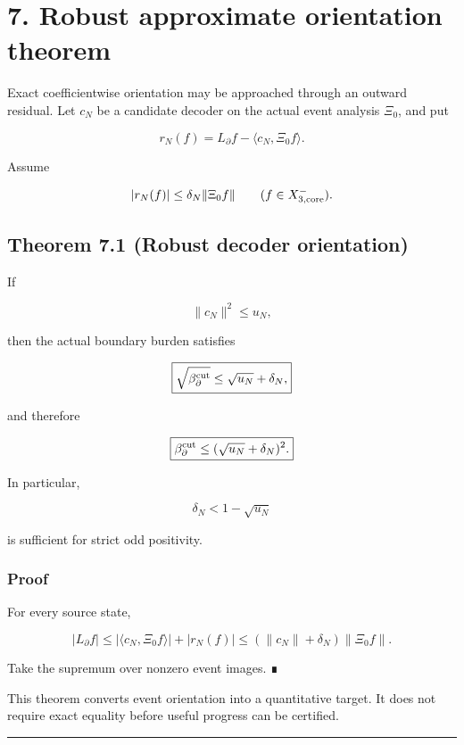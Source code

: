 \hypertarget{robust-approximate-orientation-theorem}{%
\section{7. Robust approximate orientation theorem}\label{robust-approximate-orientation-theorem}}

Exact coefficientwise orientation may be approached through an outward residual.
Let \(c_N\) be a candidate decoder on the actual event analysis \(\Xi_0\), and
put

\[
r_N(f)
=L_\partial f-\langle c_N,\Xi_0f\rangle.
\]

Assume

\[
|r_N(f)|
\le
\delta_N\|\Xi_0f\|
\qquad(f\in X_{3,\rm core}^-).
\]

\hypertarget{theorem-7.1-robust-decoder-orientation}{%
\subsection{Theorem 7.1 (Robust decoder orientation)}\label{theorem-7.1-robust-decoder-orientation}}

If

\[
\|c_N\|^2\le u_N,
\]

then the actual boundary burden satisfies

\[
\boxed{
\sqrt{\beta_\partial^{\rm cut}}
\le
\sqrt{u_N}+\delta_N,
}
\]

and therefore

\[
\boxed{
\beta_\partial^{\rm cut}
\le
(\sqrt{u_N}+\delta_N)^2.
}
\]

In particular,

\[
\boxed{
\delta_N<1-\sqrt{u_N}
}
\]

is sufficient for strict odd positivity.

\hypertarget{proof-2}{%
\subsubsection{Proof}\label{proof-2}}

For every source state,

\[
|L_\partial f|
\le
|\langle c_N,\Xi_0f\rangle|
+|r_N(f)|
\le
(\|c_N\|+\delta_N)\|\Xi_0f\|.
\]

Take the supremum over nonzero event images. ∎

This theorem converts event orientation into a quantitative target. It does not
require exact equality before useful progress can be certified.

\begin{center}\rule{0.5\linewidth}{0.5pt}\end{center}

